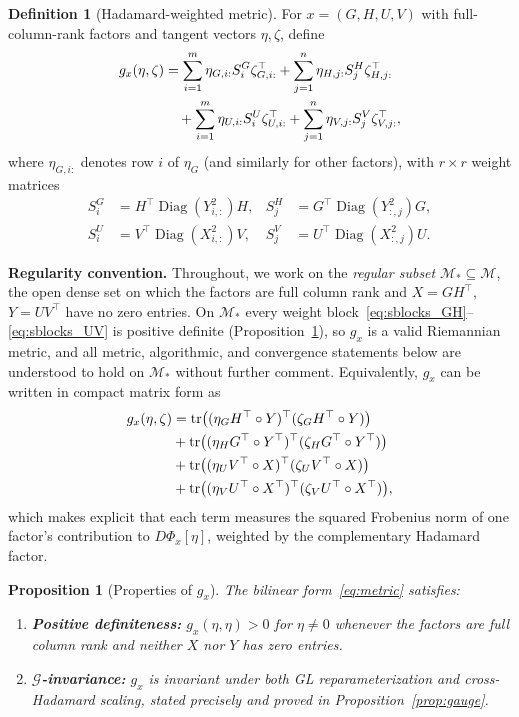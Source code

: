 \documentclass[letterpaper, 10 pt, conference]{ieeeconf}
\newcommand{\cM}{\mathcal{M}}
\newcommand{\cG}{\mathcal{G}}
\newcommand{\diag}{\operatorname{Diag}}
\newcommand{\tr}{\operatorname{tr}}
\newcommand{\Had}{\circ}
\theoremstyle{plain}
\newtheorem{proposition}{Proposition}
\theoremstyle{definition}
\newtheorem{definition}{Definition}
\theoremstyle{remark}
\newcommand{\BMorig}[1]{{#1}}%
\begin{document}
\begin{definition}[Hadamard-weighted metric]\label{def:metric}
For $x=(G,H,U,V)$ with full-column-rank factors and tangent vectors $\eta,\zeta$, define
\begin{align}
  g_x(\eta,\zeta)
  &= \sum_{i=1}^m \eta_{G,i:} S_i^G \zeta_{G,i:}^\top
   + \sum_{j=1}^n \eta_{H,j:} S_j^H \zeta_{H,j:}^\top \notag\\
  &\quad + \sum_{i=1}^m \eta_{U,i:} S_i^U \zeta_{U,i:}^\top
   + \sum_{j=1}^n \eta_{V,j:} S_j^V \zeta_{V,j:}^\top,
  \label{eq:metric}
\end{align}
where $\eta_{G,i:}$ denotes row $i$ of $\eta_G$ (and similarly for other factors), with $r\times r$ weight matrices
\begin{align}
  S_i^G &= H^\top\diag(Y_{i,:}^2)H, &
  S_j^H &= G^\top\diag(Y_{:,j}^2)G,
  \label{eq:sblocks_GH} \\
  S_i^U &= V^\top\diag(X_{i,:}^2)V, &
  S_j^V &= U^\top\diag(X_{:,j}^2)U.
  \label{eq:sblocks_UV}
\end{align}
\end{definition}
\noindent\textbf{Regularity convention.} Throughout, we work on the \emph{regular subset} $\cM_* \subseteq \cM$, the open dense set on which the factors are full column rank and $X = GH^\top$, $Y = UV^\top$ have no zero entries. On $\cM_*$ every weight block~\eqref{eq:sblocks_GH}--\eqref{eq:sblocks_UV} is positive definite (Proposition~\ref{prop:metric}), so $g_x$ is a valid Riemannian metric, and all metric, algorithmic, and convergence statements below are understood to hold on $\cM_*$ without further comment.
Equivalently, $g_x$ can be written in compact matrix form as
\begin{align}
  g_x(\eta,\zeta)
  &= \tr\bigl((\eta_G H^\top\Had Y)^\top(\zeta_G H^\top\Had Y)\bigr) \notag\\
  &+ \tr\bigl((\eta_H G^\top\Had Y^\top)^\top(\zeta_H G^\top\Had Y^\top)\bigr) \notag\\
  &+ \tr\bigl((\eta_U V^\top\Had X)^\top(\zeta_U V^\top\Had X)\bigr) \notag\\
  &+ \tr\bigl((\eta_V U^\top\Had X^\top)^\top(\zeta_V U^\top\Had X^\top)\bigr),
  \notag
\end{align}
which makes explicit that each term measures the squared Frobenius norm of one factor's contribution to $D\Phi_x[\eta]$, weighted by the complementary Hadamard factor.

\begin{proposition}[Properties of $g_x$]\label{prop:metric}
The bilinear form~\eqref{eq:metric} satisfies:
\begin{enumerate}[nosep,label=(\alph*)]
\item \textbf{Positive definiteness:} $g_x(\eta,\eta) > 0$ for $\eta \neq 0$ whenever the factors are full column rank and \BMorig{neither $X$ nor $Y$ has zero entries}.
\item \textbf{$\cG$-invariance:} $g_x$ is invariant under both GL reparameterization and cross-Hadamard scaling, stated precisely and proved in Proposition~\ref{prop:gauge}.
\end{enumerate}
\end{proposition}
\end{document}
